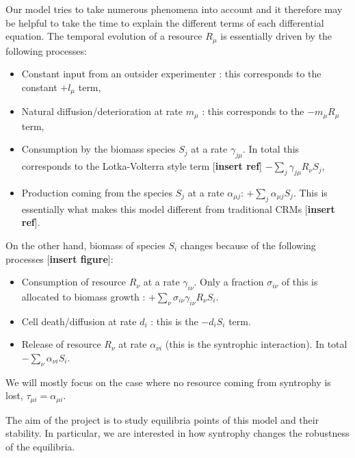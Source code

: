 \documentclass[12pt, titlepage]{report}
\begin{document}
Our model tries to take numerous phenomena into account and it therefore may be helpful to take the time to explain the different terms of each differential equation. The temporal evolution of a resource $R_\mu$ is essentially driven by the following processes:
\begin{itemize}
  \item Constant input from an outsider experimenter : this corresponds to the constant $+l_\mu$ term,
  \item Natural diffusion/deterioration at rate $m_\mu$ : this corresponds to the $-m_\mu R_\mu$ term,
  \item Consumption by the biomass species $S_j$ at a rate $\gamma_{j\mu}$. In total this corresponds to the Lotka-Volterra style term [\textbf{insert ref}] $-\sum_j \gamma_{j\mu}R_\nu S_j$,
  \item Production coming from the species $S_j$ at a rate $\alpha_{\mu j}$: $+\sum_j \alpha_{\mu j} S_j$. This is essentially what makes this model different from traditional CRMs [\textbf{insert ref}].
\end{itemize}
On the other hand, biomass of species $S_i$ changes because of the following processes [\textbf{insert figure}]:
\begin{itemize}
  \item Consumption of resource $R_\nu$ at a rate $\gamma_{i\nu}$. Only a fraction $\sigma_{i\nu}$ of this is allocated to biomass growth : $+\sum_\nu \sigma_{i\nu} \gamma_{i\nu}R_\nu S_i$.
  \item Cell death/diffusion at rate $d_i$ : this is the $-d_i S_i$ term.
  \item Release of resource $R_\nu$ at rate $\alpha_{\nu i}$ (this is the syntrophic interaction). In total $-\sum_\nu \alpha_{\nu i} S_i$.
\end{itemize}
We will mostly focus on the case where no resource coming from syntrophy is lost, \ie $\tau_{\mu i} = \alpha_{\mu i}$.

The aim of the project is to study equilibria points of this model and their stability. In particular, we are interested in how syntrophy changes the robustness of the equilibria.
\end{document}
